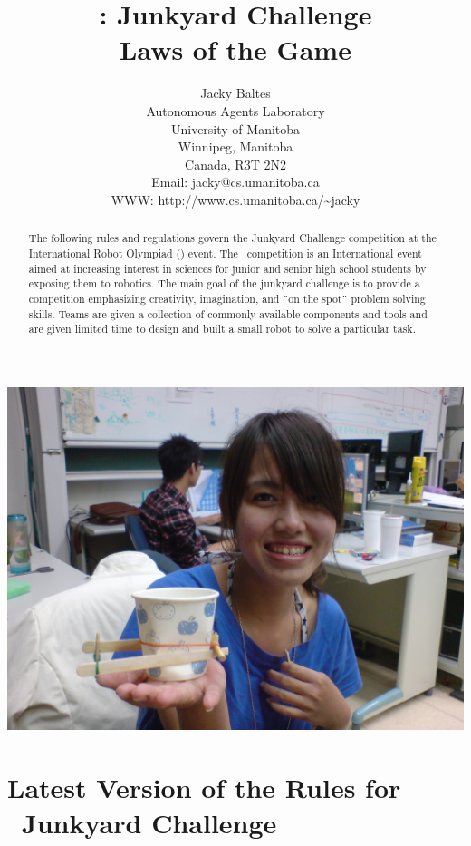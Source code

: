 \documentclass[12pt]{hurocup}
\begin{document}
\title{\IROC: Junkyard Challenge\\
  Laws of the Game \thisyear}

\author{Jacky Baltes\\
Autonomous Agents Laboratory\\
University of Manitoba\\
Winnipeg, Manitoba\\
Canada, R3T 2N2\\
Email: jacky@cs.umanitoba.ca\\
WWW: http://www.cs.umanitoba.ca/\~{ }jacky
}

\maketitle

\begin{center}
 \includegraphics[width=0.7\linewidth]{Figures/junkyard_challenge_life}
\end{center}

\begin{abstract}
The following rules and regulations govern the Junkyard Challenge
competition at the International Robot Olympiad (\IROC) event. The
\IROC\ competition is an International event aimed at increasing
interest in sciences for junior and senior high school students by
exposing them to robotics.
%
The main goal of the junkyard challenge is to provide a competition
emphasizing creativity, imagination, and ¨on the spot¨ problem solving
skills.
%
Teams are given a collection of commonly available components and
tools and are given limited time to design and built a small robot
to solve a particular task.
\end{abstract}

\section*{Latest Version of the Rules for \IROC\ Junkyard Challenge}
\label{sec:updates}
\end{document}
